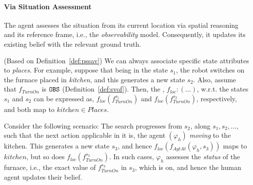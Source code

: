 \documentclass[letterpaper]{article} %
\begin{document}
\paragraph{Via Situation Assessment}

The agent assesses the situation from its current location via spatial reasoning and its reference frame, i.e., the \textit{observability} model. Consequently, it updates its existing belief with the relevant ground truth. 

(Based on Definition~\ref{def:pssav}) We can always associate specific state attributes to \textit{places}. 
For example, suppose that being in the state $s_1$, the robot switches on the furnace placed in \textit{kitchen}, and this generates a new state $s_2$. Also, assume that
$f_{\textit{TurnOn}}
$ is $\texttt{OBS}$ (Definition~\ref{def:svof}).   
Then, the , $f_{loc} : (...)$, w.r.t. the states
$s_1$ and 
$s_2$ can be expressed as, 
$f_{\textit{loc}} (f_{\textit{TurnOn}}^{s_1} )$ and $f_{\textit{loc}} (f_{\textit{TurnOn}}^{s_2} )$, respectively, and both map to $\textit{kitchen} \in Places$.

Consider the following scenario: The search progresses from $s_2$, along $s_1, s_2, ...$, such that the next action applicable in it is, the agent $(\varphi_h)$ \textit{moving} to the kitchen. This generates a new state $s_3$, and hence $f_{\textit{loc}} (f_{\textit{AgtAt}}(\varphi_h, s_3) )$ maps to $kitchen$, but so does  $f_{\textit{loc}} (f_{\textit{TurnOn}}^{s_3})$. 
In such cases, $\varphi_h$ assesses the \textit{status} of the furnace, i.e., the exact value of $f_{\textit{TurnOn}}^{s_3}$ in $s_3$, which is {\sc on}, and hence the human agent updates their belief.  
\end{document}
